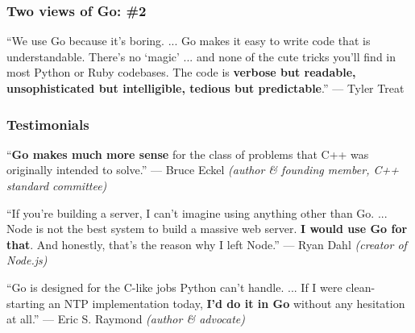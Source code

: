 \documentclass[handout,compress,t,11pt]{beamer}
\begin{document}
\begin{frame}
    \frametitle{Two views of Go: \#2}
    {\large{} ``We use Go because it's boring. ... Go makes it easy to 
    write code that is understandable. There's no `magic' ... and none of
    the cute tricks you'll find in most Python or Ruby codebases. The code is {\bf 
    verbose but \alert{readable}, unsophisticated but \alert{intelligible}, tedious 
    but \alert{predictable}}.'' --- Tyler Treat \\} \par
    \vspace{2.5\baselineskip}
\end{frame}


\begin{frame}
    \frametitle{Testimonials}
    {``{\bf Go makes much more sense} for the class of problems that C++ was 
    originally intended to solve.'' --- Bruce Eckel 
    {\em (author \& founding member, C++ standard committee)} \\} \par
    \vspace{1.7\baselineskip}
    { ``If you're building a server, I can't imagine using anything other 
    than Go. ... Node is not the best system to build a massive web server. {\bf I would 
    use Go for that}. And honestly, that's the reason why I left Node.'' --- Ryan Dahl
    {\em (creator of Node.js)} \\} \par
    \vspace{1.7\baselineskip}
    { ``Go is designed for the C-like jobs Python can't handle. ... If 
    I were clean-starting an NTP implementation today, {\bf I'd do it in Go} without any 
    hesitation at all.'' --- Eric S. Raymond {\em (author \& advocate)} \\} \par
\end{frame}
\end{document}
